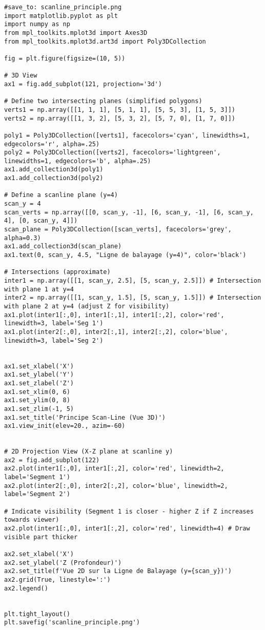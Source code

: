 \documentclass{article}
\begin{document}
\begin{verbatim}
#save_to: scanline_principle.png
import matplotlib.pyplot as plt
import numpy as np
from mpl_toolkits.mplot3d import Axes3D
from mpl_toolkits.mplot3d.art3d import Poly3DCollection

fig = plt.figure(figsize=(10, 5))

# 3D View
ax1 = fig.add_subplot(121, projection='3d')

# Define two intersecting planes (simplified polygons)
verts1 = np.array([[1, 1, 1], [5, 1, 1], [5, 5, 3], [1, 5, 3]])
verts2 = np.array([[1, 3, 2], [5, 3, 2], [5, 7, 0], [1, 7, 0]])

poly1 = Poly3DCollection([verts1], facecolors='cyan', linewidths=1, edgecolors='r', alpha=.25)
poly2 = Poly3DCollection([verts2], facecolors='lightgreen', linewidths=1, edgecolors='b', alpha=.25)
ax1.add_collection3d(poly1)
ax1.add_collection3d(poly2)

# Define a scanline plane (y=4)
scan_y = 4
scan_verts = np.array([[0, scan_y, -1], [6, scan_y, -1], [6, scan_y, 4], [0, scan_y, 4]])
scan_plane = Poly3DCollection([scan_verts], facecolors='grey', alpha=0.3)
ax1.add_collection3d(scan_plane)
ax1.text(0, scan_y, 4.5, "Ligne de balayage (y=4)", color='black')

# Intersections (approximate)
inter1 = np.array([[1, scan_y, 2.5], [5, scan_y, 2.5]]) # Intersection with plane 1 at y=4
inter2 = np.array([[1, scan_y, 1.5], [5, scan_y, 1.5]]) # Intersection with plane 2 at y=4 (adjust Z for visibility)
ax1.plot(inter1[:,0], inter1[:,1], inter1[:,2], color='red', linewidth=3, label='Seg 1')
ax1.plot(inter2[:,0], inter2[:,1], inter2[:,2], color='blue', linewidth=3, label='Seg 2')


ax1.set_xlabel('X')
ax1.set_ylabel('Y')
ax1.set_zlabel('Z')
ax1.set_xlim(0, 6)
ax1.set_ylim(0, 8)
ax1.set_zlim(-1, 5)
ax1.set_title('Principe Scan-Line (Vue 3D)')
ax1.view_init(elev=20., azim=-60)


# 2D Projection View (X-Z plane at scanline y)
ax2 = fig.add_subplot(122)
ax2.plot(inter1[:,0], inter1[:,2], color='red', linewidth=2, label='Segment 1')
ax2.plot(inter2[:,0], inter2[:,2], color='blue', linewidth=2, label='Segment 2')

# Indicate visibility (Segment 1 is closer - higher Z if Z increases towards viewer)
ax2.plot(inter1[:,0], inter1[:,2], color='red', linewidth=4) # Draw visible part thicker

ax2.set_xlabel('X')
ax2.set_ylabel('Z (Profondeur)')
ax2.set_title(f'Vue 2D sur la Ligne de Balayage (y={scan_y})')
ax2.grid(True, linestyle=':')
ax2.legend()


plt.tight_layout()
plt.savefig('scanline_principle.png')
\end{verbatim}
\end{document}
